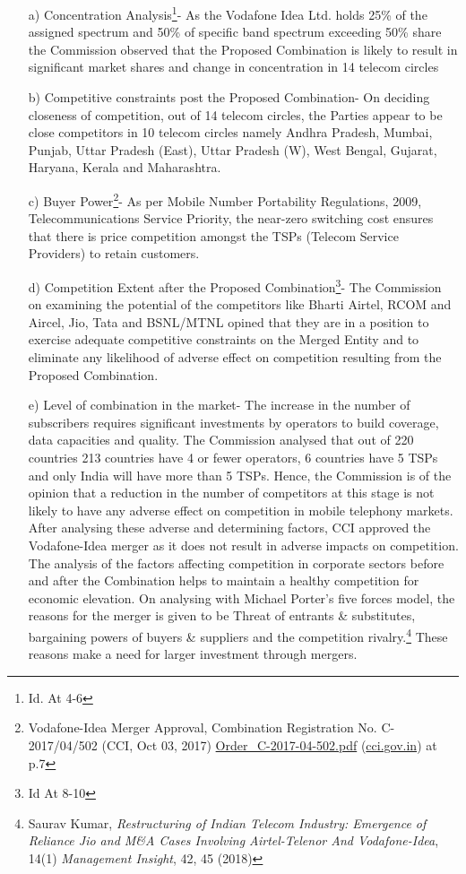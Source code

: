 \begin{multicols}{2}
\begin{enumerate}
\itemsep=0pt
\item[a)] Concentration Analysis\footnote{Id. At 4-6}- As the Vodafone Idea Ltd. holds 25\% of the assigned spectrum
and 50\% of specific band spectrum exceeding 50\% share the Commission observed that the
Proposed Combination is likely to result in significant market shares and change in
concentration in 14 telecom circles
\item[b)] Competitive constraints post the Proposed Combination- On deciding closeness of
competition, out of 14 telecom circles, the Parties appear to be close competitors in 10
telecom circles namely Andhra Pradesh, Mumbai, Punjab, Uttar Pradesh (East), Uttar
Pradesh (W), West Bengal, Gujarat, Haryana, Kerala and Maharashtra.
\item[c)] Buyer Power\footnote{Vodafone-Idea Merger Approval, Combination Registration No. C-2017/04/502 (CCI, Oct 03, 2017)
\url{Order_C-2017-04-502.pdf} (\url{cci.gov.in}) at p.7}- As per Mobile Number Portability Regulations, 2009,
Telecommunications Service Priority, the near-zero switching cost ensures that there is price
competition amongst the TSPs (Telecom Service Providers) to retain customers.
\item[d)] Competition Extent after the Proposed Combination\footnote{Id At 8-10}- The Commission on examining the
potential of the competitors like Bharti Airtel, RCOM and Aircel, Jio, Tata and BSNL/MTNL
opined that they are in a position to exercise adequate competitive constraints on the Merged
Entity and to eliminate any likelihood of adverse effect on competition resulting from the
Proposed Combination.
\item[e)] Level of combination in the market- The increase in the number of subscribers requires
significant investments by operators to build coverage, data capacities and quality. The
Commission analysed that out of 220 countries 213 countries have 4 or fewer operators, 6
countries have 5 TSPs and only India will have more than 5 TSPs. Hence, the Commission is
of the opinion that a reduction in the number of competitors at this stage is not likely to have
any adverse effect on competition in mobile telephony markets. After analysing these adverse
and determining factors, CCI approved the Vodafone-Idea merger as it does not result in
adverse impacts on competition. The analysis of the factors affecting competition in
corporate sectors before and after the Combination helps to maintain a healthy competition
for economic elevation. On analysing with Michael Porter’s five forces model, the reasons
for the merger is given to be Threat of entrants \& substitutes, bargaining powers of buyers \&
suppliers and the competition rivalry.\footnote{Saurav Kumar, \textit{Restructuring of Indian Telecom Industry: Emergence of Reliance Jio and M\&A Cases
Involving Airtel-Telenor And Vodafone-Idea}, 14(1) \textit{Management Insight}, 42, 45 (2018)} These reasons make a need for larger investment
through mergers.


\end{enumerate}
\end{multicols}
